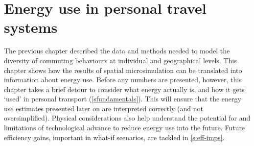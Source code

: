 \documentclass[a4paper, 11pt, twoside]{Thesis}
\begin{document}
 
 \chapter{Energy use in personal travel systems} 
\label{Chapter5}
\fancyhead[RE,LO]{\thepage}
The previous chapter described the data and methods needed to model the
diversity of commuting behaviours at individual and geographical levels.
This chapter shows how the results of spatial microsimulation can be
translated into information about energy use. Before any numbers are
presented, however, this chapter takes a brief detour to consider what
energy actually is, and how it gets `used' in personal transport
(\cref{sfundamentals}). This will ensure that the energy use estimates
presented later on are
interpreted correctly (and not oversimplified). Physical considerations also
help understand the potential for and limitations of technological advance
to reduce energy use into the future\citep{MacKay2009}. Future
efficiency gains, important in what-if scenarios, are tackled in \cref{s:eff-imps}.
\end{document}
